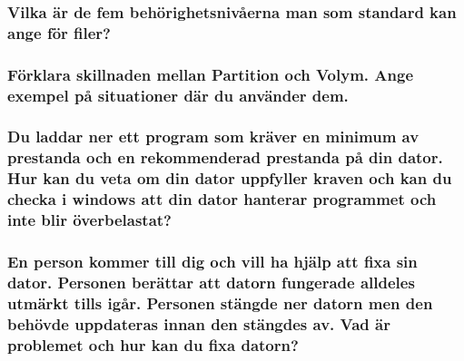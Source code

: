 \subsubsection{Vilka är de fem behörighetsnivåerna man som standard kan ange för filer?}

\subsubsection{Förklara skillnaden mellan Partition och Volym. Ange exempel på situationer där du använder dem.}

\subsubsection{Du laddar ner ett program som kräver en minimum av prestanda och en rekommenderad prestanda på din dator. Hur kan du veta om din dator uppfyller kraven och kan du checka i windows att din dator hanterar programmet och inte blir överbelastat?}

\subsubsection{En person kommer till dig och vill ha hjälp att fixa sin dator. Personen berättar att datorn fungerade alldeles utmärkt tills igår. Personen stängde ner datorn men den behövde uppdateras innan den stängdes av. Vad är problemet och hur kan du fixa datorn?}












